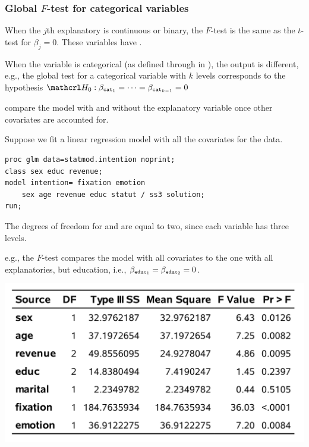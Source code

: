 \documentclass{beamer}
\begin{document}
\begin{frame}[fragile]
\frametitle{Global $F$-test for categorical variables}
\small 
\bi
\item When the $j$th explanatory is continuous or binary, the $F$-test is the \alert{same} as the $t$-test for $\beta_j=0$. These variables have .
\item When the variable is categorical (as defined through  in \SASlang), the output is different, e.g., the global test for a categorical variable  with $k$ levels corresponds to the hypothesis $\Hy_0: \beta_{\code{cat}_1}=\cdots = \beta_{\code{cat}_{k-1}}=0$
\bi \item compare the model with and without the explanatory variable once other covariates are accounted for.
\ei 
\ei 
\end{frame}
\begin{frame}[fragile]
Suppose we fit a linear regression model with all the covariates for the  data.
\begin{tcolorbox}[colback=white, colframe=hecblue, title=\SASlang code to fit the full linear model]
\begin{verbatim}
proc glm data=statmod.intention noprint;
class sex educ revenue;
model intention= fixation emotion 
    sex age revenue educ statut / ss3 solution;
run;
\end{verbatim}
\end{tcolorbox}
\end{frame}
\begin{frame}

\bi \item 
The degrees of freedom for  and  are equal to two, since each variable has three levels.
\item e.g., the $F$-test compares the model with all covariates to the one with all explanatories, but education, i.e., $\beta_{\texttt{educ}_1} = \beta_{\texttt{educ}_2}=0$.
\ei
\begin{center}
\includegraphics[width = 0.7\linewidth]{img/c2/slides3-e10.png}
\end{center}

\end{frame}
\end{document}
